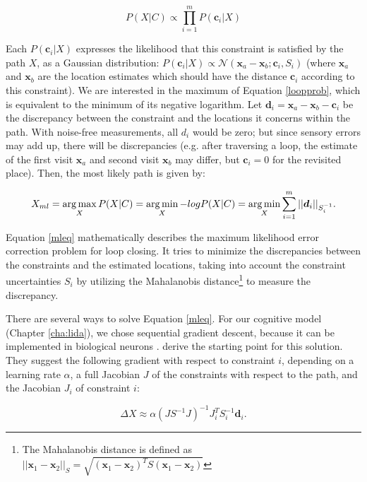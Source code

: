\begin{equation}
\label{loopprob}
P(X|C) \propto \prod_{i=1}^{m} P(\bm c_i|X) 
\end{equation}

Each $P(\bm c_i|X)$ expresses the likelihood that this constraint is satisfied by the path $X$, as a Gaussian distribution: $P(\bm c_i|X)\propto\mathcal{N}(\bm x_a-\bm x_b;\bm c_i, S_i)$ (where $\bm x_a$ and $\bm x_b$ are the location estimates which should have the distance $\bm c_i$ according to this constraint). We are interested in the maximum of Equation \ref{loopprob}, which is equivalent to the minimum of its negative logarithm. Let $\bm d_i=\bm x_a - \bm x_b - \bm c_i$ be the discrepancy between the constraint and the locations it concerns within the path. With noise-free measurements, all $d_i$ would be zero; but since sensory errors may add up, there will be discrepancies (e.g. after traversing a loop, the estimate of the first visit $\bm x_a$ and second visit $\bm x_b$ may differ, but $\bm c_i=0$ for the revisited place). Then, the most likely path is given by:

\begin{equation}
\label{mleq}
X_{ml} = \operatorname*{arg\,max}_X P(X|C) = \operatorname*{arg\,min}_X -log P(X|C) = \operatorname*{arg\,min}_X \sum_{i=1}^{m} ||\bm d_i||_{S_i^{-1}}.
\end{equation}

Equation \ref{mleq} mathematically describes the maximum likelihood error correction problem for loop closing. It tries to minimize the discrepancies between the constraints and the estimated locations, taking into account the constraint uncertainties $S_i$ by utilizing the Mahalanobis distance\footnote{The Mahalanobis distance is defined as $||\bm x_1-\bm x_2||_S = \sqrt{(\bm x_1-\bm x_2)^TS(\bm x_1-\bm x_2)}$} to measure the discrepancy.

There are several ways to solve Equation \ref{mleq}. For our cognitive model (Chapter \ref{cha:lida}), we chose sequential gradient descent, because it can be implemented in biological neurons \citep{bengio2015towards, bengio2015objective}. \cite{olson2006fast} derive the starting point for this solution. They suggest the following gradient with respect to constraint $i$, depending on a learning rate $\alpha$, a full Jacobian $J$ of the constraints with respect to the path, and the Jacobian $J_i$ of constraint $i$:

\begin{equation}
\label{gradient}
\Delta X \approx \alpha (JS^{-1}J)^{-1}J_i^TS_i^{-1} \bm d_i.
\end{equation}

